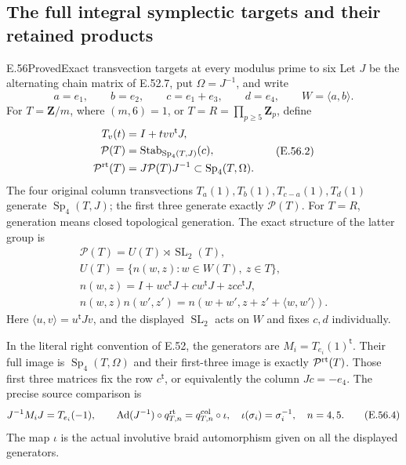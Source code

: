 \subsection{The full integral symplectic targets and their retained products}

\begin{statement}{E.56}{Proved}{Exact transvection targets at every modulus prime to six}
Let $J$ be the alternating chain matrix of E.52.7, put
$\Omega=J^{-1}$, and write
\[
 a=e_1,\qquad b=e_2,\qquad c=e_1+e_3,\qquad d=e_4,
 \qquad W=\langle a,b\rangle.
 \tag{E.56.1}
\]
For $T=\mathbf Z/m$, where $(m,6)=1$, or
$T=R=\prod_{p\ge5}\mathbf Z_p$, define
\[
 \begin{split}
 T_v(t)&=I+t vv^{\mathsf t}J,\\
 \mathcal P(T)&=\operatorname{Stab}_{\operatorname{Sp}_4(T,J)}(c),\\
 \mathcal P^{\rm rt}(T)&=J\mathcal P(T)J^{-1}
                  \subset\operatorname{Sp}_4(T,\Omega).
 \end{split}
 \tag{E.56.2}
\]
The four original column transvections
$T_a(1),T_b(1),T_{c-a}(1),T_d(1)$ generate
$\operatorname{Sp}_4(T,J)$; the first three generate
exactly $\mathcal P(T)$. For $T=R$, generation means
closed topological generation. The exact structure of
the latter group is
\[
 \begin{gathered}
 \mathcal P(T)=U(T)\rtimes\operatorname{SL}_2(T),\\
 U(T)=\{n(w,z):w\in W(T),\ z\in T\},\\
 n(w,z)=I+w c^{\mathsf t}J+c w^{\mathsf t}J
                         +z c c^{\mathsf t}J,\\
 n(w,z)n(w',z')
     =n(w+w',z+z'+\langle w,w'\rangle).
 \end{gathered}
 \tag{E.56.3}
\]
Here $\langle u,v\rangle=u^{\mathsf t}Jv$, and the
displayed $\operatorname{SL}_2$ acts on $W$ and fixes
$c,d$ individually.

In the literal right convention of E.52, the generators
are $M_i=T_{e_i}(1)^{\mathsf t}$. Their full image is
$\operatorname{Sp}_4(T,\Omega)$ and their first-three
image is exactly $\mathcal P^{\rm rt}(T)$. Those first
three matrices fix the row $c^{\mathsf t}$, or equivalently the column
$Jc=-e_4$. The precise source comparison is
\[
 J^{-1}M_iJ=T_{e_i}(-1),\qquad
 \operatorname{Ad}(J^{-1})\circ q^{\rm rt}_{T,n}
       =q^{\rm col}_{T,n}\circ\iota,
 \quad \iota(\sigma_i)=\sigma_i^{-1},\quad n=4,5.
 \tag{E.56.4}
\]
The map $\iota$ is the actual involutive braid
automorphism given on all the displayed generators.


\end{statement}
